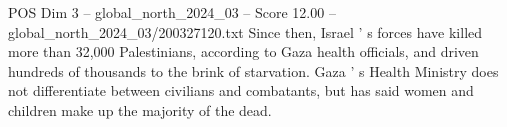 \begin{textsample}{POS Dim 3 – global\_north\_2024\_03 – Score 12.00 – global\_north\_2024\_03/200327120.txt}
Since then, Israel ' s forces have killed more than 32,000 Palestinians, according to Gaza health officials, and driven hundreds of thousands to the brink of starvation.
Gaza ' s Health Ministry does not differentiate between civilians and combatants, but has said women and children make up the majority of the dead.

\end{textsample}
